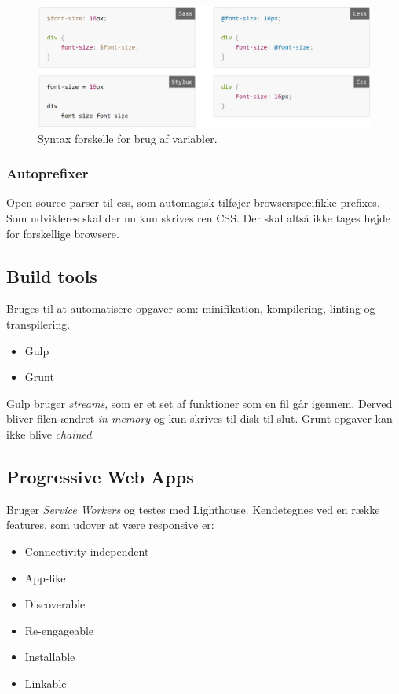 \begin{figure}[H]
	\centering
	\includegraphics[width=\linewidth]{figs/spm3/css-prepro-variables}
	\caption{Syntax forskelle for brug af variabler.}
	\label{fig:css-prepro-variables}
\end{figure}

\subsubsection{Autoprefixer}
Open-source parser til css, som automagisk tilføjer browserspecifikke prefixes. Som udvikleres skal der nu kun skrives ren CSS. Der skal altså ikke tages højde for forskellige browsere.

\subsection{Build tools}
Bruges til at automatisere opgaver som: minifikation, kompilering, linting og transpilering.

\begin{itemize}
	\item Gulp 
	\item Grunt
\end{itemize}

Gulp bruger \textit{streams}, som er et set af funktioner som en fil går igennem. Derved bliver filen ændret \textit{in-memory} og kun skrives til disk til slut. Grunt opgaver kan ikke blive \textit{chained}.

\subsection{Progressive Web Apps}
Bruger \textit{Service Workers} og testes med Lighthouse. Kendetegnes ved en række features, som udover at være responsive er:

\begin{multicols}{2}
\begin{itemize}
	\item Connectivity independent
	\item App-like
	\item Discoverable
	\item Re-engageable
	\item Installable
	\item Linkable
\end{itemize}
\end{multicols}

